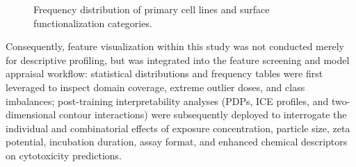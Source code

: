 \documentclass[letterpaper]{article}
\begin{document}
\begin{figure}[H]
  \centering
  \begin{minipage}{0.49\linewidth}
    \centering
  \end{minipage}
  \hfill
  \begin{minipage}{0.49\linewidth}
    \centering
  \end{minipage}
  \caption{Frequency distribution of primary cell lines and surface functionalization categories.}
  \label{fig:senp-categorical-frequency}
\end{figure}

Consequently, feature visualization within this study was not conducted merely for descriptive profiling, but was integrated into the feature screening and model appraisal workflow: statistical distributions and frequency tables were first leveraged to inspect domain coverage, extreme outlier doses, and class imbalances; post-training interpretability analyses (PDPs, ICE profiles, and two-dimensional contour interactions) were subsequently deployed to interrogate the individual and combinatorial effects of exposure concentration, particle size, zeta potential, incubation duration, assay format, and enhanced chemical descriptors on cytotoxicity predictions.
\end{document}
